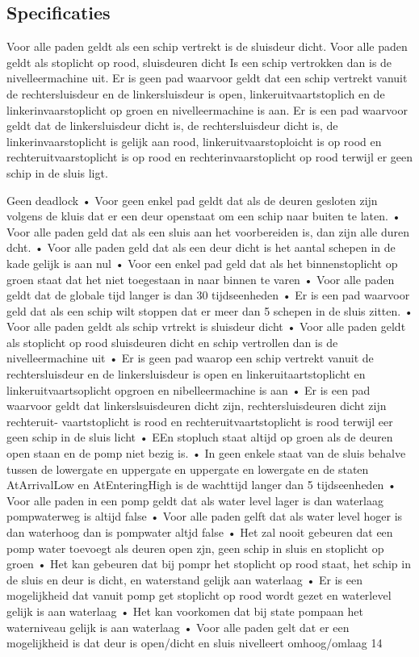 \subsection{Specificaties}

Voor alle paden geldt als een schip vertrekt is de sluisdeur dicht. 
Voor alle paden geldt als stoplicht op rood, sluisdeuren dicht 
Is een schip vertrokken dan is de nivelleermachine uit. 
Er is geen pad waarvoor geldt dat een schip vertrekt vanuit de rechtersluisdeur en de linkersluisdeur is open, linkeruitvaartstoplich en de linkerinvaarstoplicht op groen en nivelleermachine is aan. 
Er is een pad waarvoor geldt dat de linkersluisdeur dicht is, de rechtersluisdeur dicht is, de linkerinvaarstoplicht is gelijk aan rood, linkeruitvaarstoploicht is op rood en rechteruitvaarstoplicht is op rood en rechterinvaarstoplicht op rood terwijl er geen schip in de sluis ligt. 

Geen deadlock 
• Voor geen enkel pad geldt dat als de deuren gesloten zijn volgens de kluis dat er een deur openstaat om 
een schip naar buiten te laten. 
• Voor alle paden geld dat als een sluis aan het voorbereiden is, dan zijn alle duren dcht. 
• Voor alle paden geld dat als een deur dicht is het aantal schepen in de kade gelijk is aan nul 
• Voor een enkel pad geld dat als het binnenstoplicht op groen staat dat het niet toegestaan in naar binnen 
te varen 
• Voor alle paden geldt dat de globale tijd langer is dan 30 tijdseenheden 
• Er is een pad waarvoor geld dat als een schip wilt stoppen dat er meer dan 5 schepen in de sluis zitten. 
• Voor alle paden geldt als schip vrtrekt is sluisdeur dicht 
• Voor alle paden geldt als stoplicht op rood sluisdeuren dicht en schip vertrollen dan is de nivelleermachine 
uit 
• Er is geen pad waarop een schip vertrekt vanuit de rechtersluisdeur en de linkersluisdeur is open en 
linkeruitaartstoplicht en linkeruitvaartsoplicht opgroen en nibelleermachine is aan 
• Er is een pad waarvoor geldt dat linkerslsuisdeuren dicht zijn, rechtersluisdeuren dicht zijn rechteruit- 
vaartstoplicht is rood en rechteruitvaartstoplicht is rood terwijl eer geen schip in de sluis licht 
• EEn stopluch staat altijd op groen als de deuren open staan en de pomp niet bezig is. 
• In geen enkele staat van de sluis behalve tussen de lowergate en uppergate en uppergate en lowergate en 
de staten AtArrivalLow en AtEnteringHigh is de wachttijd langer dan 5 tijdseenheden 
• Voor alle paden in een pomp geldt dat als water level lager is dan waterlaag pompwaterweg is altijd false 
• Voor alle paden gelft dat als water level hoger is dan waterhoog dan is pompwater altjd false 
• Het zal nooit gebeuren dat een pomp water toevoegt als deuren open zjn, geen schip in sluis en stoplicht 
op groen 
• Het kan gebeuren dat bij pompr het stoplicht op rood staat, het schip in de sluis en deur is dicht, en 
waterstand gelijk aan waterlaag 
• Er is een mogelijkheid dat vanuit pomp get stoplicht op rood wordt gezet en waterlevel gelijk is aan 
waterlaag 
• Het kan voorkomen dat bij state pompaan het waterniveau gelijk is aan waterlaag 
• Voor alle paden gelt dat er een mogelijkheid is dat deur is open/dicht en sluis nivelleert omhoog/omlaag 
14 




